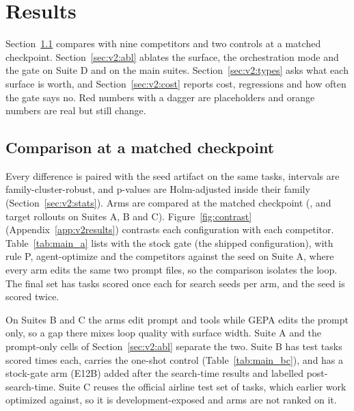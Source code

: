 \section{Results}
\label{sec:v2:results}

Section~\ref{sec:v2:cmp} compares \capevolve{} with nine competitors and two controls at a matched checkpoint. Section~\ref{sec:v2:abl} ablates the surface, the orchestration mode and the gate on Suite D and on the main suites. Section~\ref{sec:v2:types} asks what each surface is worth, and Section~\ref{sec:v2:cost} reports cost, regressions and how often the gate says no. Red numbers with a dagger are placeholders and orange numbers are real but still change.

\subsection{Comparison at a matched checkpoint}
\label{sec:v2:cmp}

Every difference is paired with the seed artifact on the same tasks, intervals are family-cluster-robust, and p-values are Holm-adjusted inside their family (Section~\ref{sec:v2:stats}). Arms are compared at the matched checkpoint \ckpt{} (\mockBstarA{}, \mockBstarB{} and \mockBstarC{} target rollouts on Suites A, B and C). Figure~\ref{fig:contrast} (Appendix~\ref{app:v2results}) contrasts each configuration with each competitor. Table~\ref{tab:main_a} lists \capevolve{} with the stock gate (the shipped configuration), \capevolve{} with rule P, agent-optimize and the competitors against the seed on Suite A, where every arm edits the same two prompt files, so the comparison isolates the loop. The final set has \mockTA{} tasks scored once each for \mockSeedsA{} search seeds per arm, and the seed is scored twice.



On Suites B and C the \capevolve{} arms edit prompt and tools while GEPA edits the prompt only, so a gap there mixes loop quality with surface width. Suite A and the prompt-only cells of Section~\ref{sec:v2:abl} separate the two. Suite B has \mockTB{} test tasks scored \mockTrialsB{} times each, carries the one-shot control (Table~\ref{tab:main_bc}), and has a stock-gate arm (E12B) added after the search-time results and labelled post-search-time. Suite C reuses the official airline test set of \mockTC{} tasks, which earlier work optimized against, so it is development-exposed and arms are not ranked on it.

